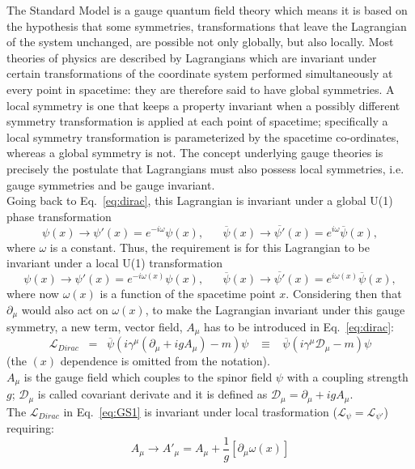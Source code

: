 The Standard Model is a gauge quantum field theory which means it is based on the hypothesis that some symmetries, \ie transformations that leave the Lagrangian of the system unchanged, are possible not only globally, but also locally.
Most theories of physics are described by Lagrangians which are invariant under certain transformations of the coordinate system performed simultaneously at every point in spacetime: they are therefore said to have global symmetries. A local symmetry is one that keeps a property invariant when a possibly different symmetry transformation is applied at each point of spacetime; specifically a local symmetry transformation is parameterized by the spacetime co-ordinates, whereas a global symmetry is not. The concept underlying gauge theories is precisely the postulate that Lagrangians must also possess local symmetries, i.e. gauge symmetries and be gauge invariant.\\
Going back to Eq.~\ref{eq:dirac}, this Lagrangian is invariant under a global U(1) phase transformation
\begin{equation}
\label{eq:globalT}
 \psi(x) \rightarrow \psi'(x) = e^{-i\omega} \psi(x), \; \; \; \; \; \;    \overline{\psi}(x) \rightarrow \overline{\psi'}(x) = e^{i\omega} \overline{\psi}(x),
\end{equation}
where $\omega$ is a constant. Thus, the requirement is for this Lagrangian to be invariant under a local U(1) transformation
\begin{equation}
\label{eq:localT}
 \psi(x) \rightarrow \psi'(x) = e^{-i\omega(x)} \psi(x), \; \; \; \; \; \;    \overline{\psi}(x) \rightarrow \overline{\psi'}(x) = e^{i\omega(x)} \overline{\psi}(x),
\end{equation}
where now $\omega(x)$ is a function of the spacetime point $x$. Considering then that $\partial_{\mu}$ would also act on $\omega(x)$, to make the 
Lagrangian invariant under this gauge symmetry, a new term, vector field, $A_{\mu}$ has to be introduced in Eq.~\ref{eq:dirac}:
\begin{equation}
\label{eq:GS1}
 \mathcal{L}_{Dirac} \;\; = \;\; \overline{\psi} (i\gamma^{\mu} (\partial_{\mu} + igA_{\mu})-m) \psi \;\;\; \equiv  \;\;\; \overline{\psi} (i\gamma^{\mu}\mathcal{D}_{\mu}-m) \psi 
\end{equation}
(the $(x)$ dependence is omitted from the notation).\\
 $A_{\mu}$ is the gauge field which couples to the spinor field $\psi$ with a coupling strength $g$; $\mathcal{D}_{\mu}$ is called covariant derivate and it is defined as $\mathcal{D}_{\mu} = \partial_{\mu} + igA_{\mu}$. \\
The $\mathcal{L}_{Dirac}$ in Eq.~\ref{eq:GS1} is invariant under local trasformation ($\mathcal{L}_{\psi} =\mathcal{L}_{\psi'}$) requiring:
\begin{equation}
\label{eq:GS2}
A_{\mu} \rightarrow A'_{\mu} =  A_{\mu} + \frac{1}{g}[\partial_{\mu} \omega(x)]
\end{equation}

